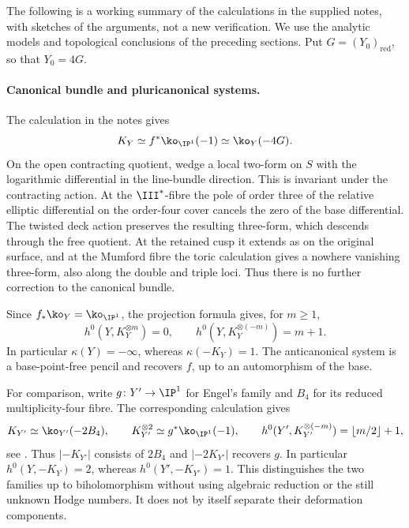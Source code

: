 	
	
	The following is a working summary of the calculations in the supplied
	notes, with sketches of the arguments, not a new verification. We use
	the analytic models and topological conclusions of the preceding
	sections. Put $G=(Y_0)_{\mathrm{red}}$, so that $Y_0=4G$.
	
	\paragraph{Canonical bundle and pluricanonical systems.}
	The calculation in the notes gives
	\[
	K_Y\simeq f^*\ko_{\IP^1}(-1)\simeq\ko_Y(-4G).
	\]
	On the open contracting quotient, wedge a local two-form on $S$
	with the logarithmic differential in the line-bundle direction.
	This is invariant under the contracting action. At the
	$\III^*$-fibre the pole of order three of the relative elliptic
	differential on the order-four cover cancels the zero of the base
	differential. The twisted deck action preserves the resulting
	three-form, which descends through the free quotient. At the
	retained cusp it extends as on the original surface, and at the
	Mumford fibre the toric calculation gives a nowhere vanishing
	three-form, also along the double and triple loci. Thus there is
	no further correction to the canonical bundle.
	
	Since $f_*\ko_Y=\ko_{\IP^1}$, the projection formula gives, for $m\geq1$,
	\[
	h^0(Y,K_Y^{\otimes m})=0,\qquad
	h^0(Y,K_Y^{\otimes(-m)})=m+1.
	\]
	In particular $\kappa(Y)=-\infty$, whereas $\kappa(-K_Y)=1$.
	The anticanonical system is a base-point-free pencil and recovers
	$f$, up to an automorphism of the base.
	
	For comparison, write $g\colon Y'\to\IP^1$ for Engel's family and
	$B_4$ for its reduced multiplicity-four fibre. The corresponding
	calculation gives
	\[
	K_{Y'}\simeq\ko_{Y'}(-2B_4),\qquad
	K_{Y'}^{\otimes2}\simeq g^*\ko_{\IP^1}(-1),\qquad
	h^0(Y',K_{Y'}^{\otimes(-m)})=\lfloor m/2\rfloor+1,
	\]
	see \cite[Proposition~9.11]{Alpoge2026}. Thus $|-K_{Y'}|$ consists
	of $2B_4$ and $|-2K_{Y'}|$ recovers $g$. In particular
	$h^0(Y,-K_Y)=2$, whereas $h^0(Y',-K_{Y'})=1$. This distinguishes
	the two families up to biholomorphism without using algebraic
	reduction or the still unknown Hodge numbers. It does not by itself
	separate their deformation components.
	
